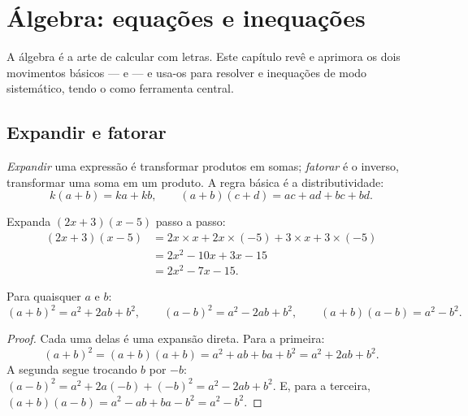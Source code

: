 \chapter{Álgebra: equações e inequações}\label{ch:g10:algebra}

A álgebra é a arte de calcular com letras. Este capítulo revê e aprimora
os dois movimentos básicos ---  e  --- e usa-os para
resolver  e inequações de modo sistemático, tendo o  como ferramenta central.

\section{Expandir e fatorar}

\begin{definition}\label{def:g10:algebra:expand}
\emph{Expandir} uma expressão é transformar produtos em
somas; \emph{fatorar} é o inverso, transformar uma soma em
um produto. A regra básica é a distributividade:
\[
k(a + b) = ka + kb,
\qquad
(a + b)(c + d) = ac + ad + bc + bd .
\]
\end{definition}

\begin{example}\label{ex:g10:algebra:expand}
Expanda $(2x + 3)(x - 5)$ passo a passo:
\begin{align*}
(2x + 3)(x - 5)
&= 2x \times x + 2x \times (-5) + 3 \times x + 3 \times (-5) \\
&= 2x^2 - 10x + 3x - 15 \\
&= 2x^2 - 7x - 15 .
\end{align*}
\end{example}

\begin{theorem}\label{thm:g10:algebra:identities}
Para quaisquer  $a$ e $b$:
\[
(a+b)^2 = a^2 + 2ab + b^2,
\qquad
(a-b)^2 = a^2 - 2ab + b^2,
\qquad
(a+b)(a-b) = a^2 - b^2 .
\]
\end{theorem}

\begin{proof}
Cada uma delas é uma expansão direta. Para a primeira:
\[
(a+b)^2 = (a+b)(a+b) = a^2 + ab + ba + b^2 = a^2 + 2ab + b^2 .
\]
A segunda segue trocando $b$ por $-b$: $(a-b)^2 = a^2 + 2a(-b) +
(-b)^2 = a^2 - 2ab + b^2$. E, para a terceira,
$(a+b)(a-b) = a^2 - ab + ba - b^2 = a^2 - b^2$.
\end{proof}

